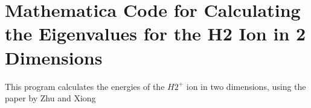 \chapter{Mathematica Code for Calculating the Eigenvalues for the H2 Ion in 2 Dimensions}
\label{AppendixE}

This program calculates the energies of the $ H2^{+} $ ion in two dimensions, using the paper by Zhu and Xiong \cite{H2Plus2d2}


